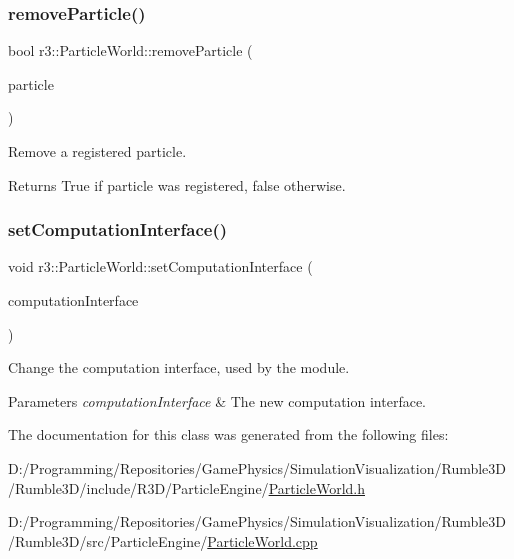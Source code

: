 \subsubsection{\texorpdfstring{remove\+Particle()}{removeParticle()}}
{\footnotesize\ttfamily bool r3\+::\+Particle\+World\+::remove\+Particle (\begin{DoxyParamCaption}\item[{\mbox{\hyperlink{classr3_1_1_particle}{Particle}} $\ast$}]{particle }\end{DoxyParamCaption})}



Remove a registered particle. 

\begin{DoxyReturn}{Returns}
True if particle was registered, false otherwise. 
\end{DoxyReturn}
\mbox{\label{classr3_1_1_particle_world_adf5630d53659e9ced254d33990f15a9d}} 
\subsubsection{\texorpdfstring{set\+Computation\+Interface()}{setComputationInterface()}}
{\footnotesize\ttfamily void r3\+::\+Particle\+World\+::set\+Computation\+Interface (\begin{DoxyParamCaption}\item[{\mbox{\hyperlink{classr3_1_1_particle_engine_c_i}{Particle\+Engine\+CI}} $\ast$}]{computation\+Interface }\end{DoxyParamCaption})}



Change the computation interface, used by the module. 


\begin{DoxyParams}{Parameters}
{\em computation\+Interface} & The new computation interface. \\
\hline
\end{DoxyParams}


The documentation for this class was generated from the following files\+:\begin{DoxyCompactItemize}
\item 
D\+:/\+Programming/\+Repositories/\+Game\+Physics/\+Simulation\+Visualization/\+Rumble3\+D/\+Rumble3\+D/include/\+R3\+D/\+Particle\+Engine/\mbox{\hyperlink{_particle_world_8h}{Particle\+World.\+h}}\item 
D\+:/\+Programming/\+Repositories/\+Game\+Physics/\+Simulation\+Visualization/\+Rumble3\+D/\+Rumble3\+D/src/\+Particle\+Engine/\mbox{\hyperlink{_particle_world_8cpp}{Particle\+World.\+cpp}}\end{DoxyCompactItemize}
